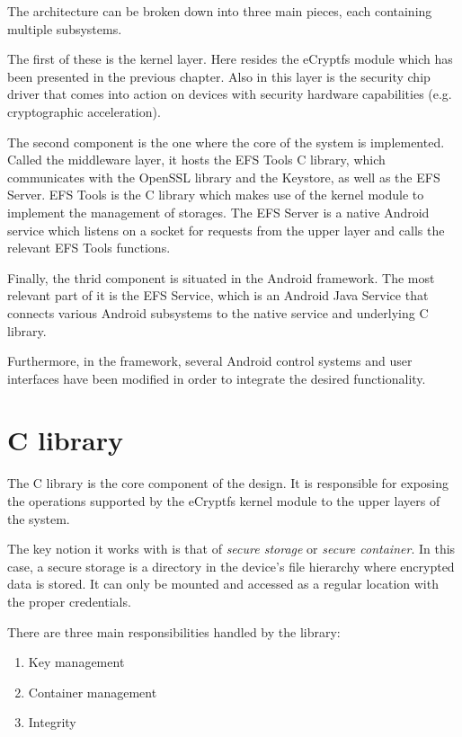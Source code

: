 The architecture can be broken down into three main pieces, each containing multiple subsystems.

The first of these is the kernel layer. Here resides the eCryptfs module which has been presented in the previous chapter. Also in this layer is the security chip driver that comes into action on devices with security hardware capabilities (e.g. cryptographic acceleration).

The second component is the one where the core of the system is implemented. Called the middleware layer, it hosts the EFS Tools C library, which communicates with the OpenSSL library and the Keystore, as well as the EFS Server. EFS Tools is the C library which makes use of the kernel module to implement the management of storages. The EFS Server is a native Android service which listens on a socket for requests from the upper layer and calls the relevant EFS Tools functions.

Finally, the thrid component is situated in the Android framework. The most relevant part of it is the EFS Service, which is an Android Java Service that connects various Android subsystems to the native service and underlying C library.

Furthermore, in the framework, several Android control systems and user interfaces have been modified in order to integrate the desired functionality.

\section{C library}
\label{sec:c-multi-user}

The C library is the core component of the design. It is responsible for exposing the operations supported by the eCryptfs kernel module to the upper layers of the system.

The key notion it works with is that of \textit{secure storage} or \textit{secure container}. In this case, a secure storage is a directory in the device's file hierarchy where encrypted data is stored. It can only be mounted and accessed as a regular location with the proper credentials.

There are three main responsibilities handled by the library:
\begin{enumerate}
\item Key management
\item Container management
\item Integrity
\end{enumerate}

